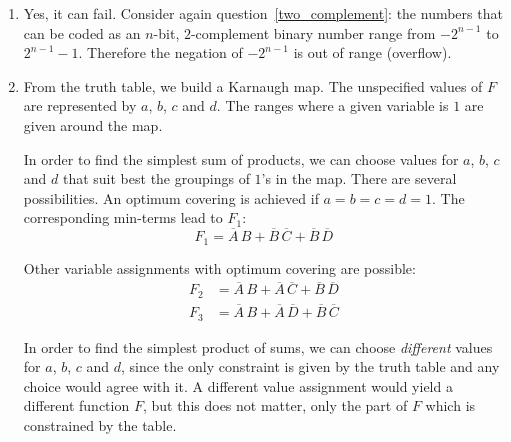 \begin{enumerate}
  \item Yes, it can fail. Consider again
    question~\ref{two_complement}: the numbers that can be coded as an
    \(n\)-bit, \(2\)-complement binary number range from \(-2^{n-1}\)
    to \(2^{n-1}-1\). Therefore the negation of \(-2^{n-1}\) is out of
    range (overflow).

  \item
From the truth table, we build a Karnaugh map. The unspecified values
of \(F\) are represented by \(a\), \(b\), \(c\) and \(d\). The ranges
where a given variable is \(1\) are given around the map.
\begin{center}
\kvnoindex
{}
\end{center}
In order to find the simplest sum of products, we can choose values
for \(a\), \(b\), \(c\) and \(d\) that suit best the groupings of
\(1\)'s in the map. There are several possibilities. An optimum
covering is achieved if \(a=b=c=d=1\). The corresponding min-terms
lead to \(F_1\):
\[
F_1 = \overline{A}\,B + \overline{B}\,\overline{C} +
\overline{B}\,\overline{D}
\]
\begin{center}
\end{center}
Other variable assignments with optimum covering are possible:
\begin{align*}
F_2 &= \overline{A}\,B + \overline{A}\,\overline{C} +
\overline{B}\,\overline{D}\\
F_3 &= \overline{A}\,B + \overline{A}\,\overline{D} +
\overline{B}\,\overline{C}
\end{align*}
\begin{center}
\end{center}
In order to find the simplest product of sums, we can choose
\emph{different} values for \(a\), \(b\), \(c\) and \(d\), since the
only constraint is given by the truth table and any choice would agree
with it. A different value assignment would yield a different function
\(F\), but this does not matter, only the part of \(F\) which is
constrained by the table.


\end{enumerate}
